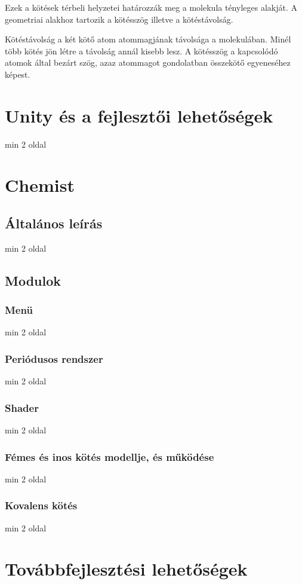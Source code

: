 \documentclass[colorlinks]{thesis-ekf}
\theoremstyle{definition}
\theoremstyle{remark}
\begin{document}
Ezek a kötések térbeli helyzetei határozzák meg a molekula tényleges alakját. A geometriai alakhoz tartozik a kötésszög illetve a kötéstávolság. 

Kötéstávolság a két kötő atom atommagjának távolsága a molekulában. Minél több kötés jön létre a távolság annál kisebb lesz. A kötésszög a kapcsolódó atomok által bezárt szög, azaz atommagot gondolatban összekötő egyeneséhez képest. \cite{eke_kemia_ppt}
\chapter{Unity és a fejlesztői lehetőségek}
min 2 oldal
\chapter{Chemist}
\section{Általános leírás}
min 2 oldal
\section{Modulok}
\subsection{Menü}
min 2 oldal
\subsection{Periódusos rendszer}
min 2 oldal
\subsection{Shader}
min 2 oldal
\subsection{Fémes és inos kötés modellje, és működése}
min 2 oldal
\subsection{Kovalens kötés}
min 2 oldal
\chapter{Továbbfejlesztési lehetőségek}
\end{document}
